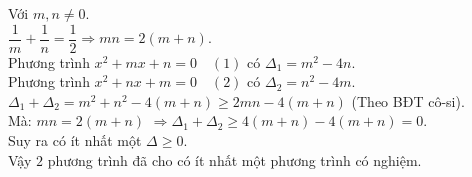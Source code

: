 \begin{ex}
	\loigiai
	{ Với $ m, n \ne 0 $.\\
		$ \dfrac{1}{m} + \dfrac{1}{n} = \dfrac{1}{2} \Rightarrow mn = 2(m+n) .$\\
		Phương trình $ x^2 +mx +n =0 \quad (1) $ có $ \Delta_1 = m^2 -4n. $\\
		Phương trình $ x^2 +nx +m =0 \quad (2) $ có $ \Delta_2 = n^2 - 4m. $\\
		$ \Delta_1 + \Delta_2 = m^2 +n^2 -4(m+n) \ge 2mn - 4(m+n) $ (Theo BĐT cô-si).\\
		Mà: $ mn= 2(m+n) $
		$ \Rightarrow \Delta_1 + \Delta_2 \ge 4(m+n) -4(m+n) = 0 .$\\
		Suy ra có ít nhất một $ \Delta \ge 0$.\\
		Vậy $ 2 $ phương trình đã cho có ít nhất một phương trình có nghiệm.
	
}
\end{ex}
